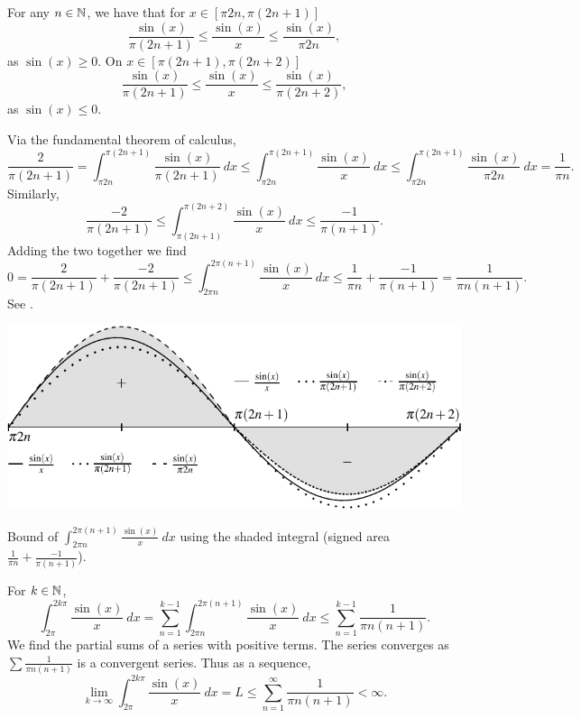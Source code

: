 \begin{example}
For any $n \in {\mathbb{N}}$, we have that for $x \in [\pi 2n, \pi (2n+1)]$
\begin{equation*}
\frac{\sin(x)}{\pi (2n+1)}
\leq
\frac{\sin(x)}{x}
\leq
\frac{\sin(x)}{\pi 2n} ,
\end{equation*}
as $\sin(x) \geq 0$.  On $x \in [\pi (2n+1), \pi (2n+2)]$
\begin{equation*}
\frac{\sin(x)}{\pi (2n+1)}
\leq
\frac{\sin(x)}{x}
\leq
\frac{\sin(x)}{\pi (2n+2)} ,
\end{equation*}
as $\sin(x) \leq 0$.

Via the fundamental theorem of calculus,
\begin{equation*}
\frac{2}{\pi (2n+1)}
=
\int_{\pi 2n}^{\pi (2n+1)}
\frac{\sin(x)}{\pi (2n+1)}
~dx
\leq
\int_{\pi 2n}^{\pi (2n+1)}
\frac{\sin(x)}{x}
~dx
\leq
\int_{\pi 2n}^{\pi (2n+1)}
\frac{\sin(x)}{\pi 2n}
~dx
=
\frac{1}{\pi n} .
\end{equation*}
Similarly,
\begin{equation*}
\frac{-2}{\pi (2n+1)}
\leq
\int_{\pi (2n+1)}^{\pi (2n+2)}
\frac{\sin(x)}{x}
~dx
\leq
\frac{-1}{\pi (n+1)} .
\end{equation*}
Adding the two together we find
\begin{equation*}
0
=
\frac{2}{\pi (2n+1)}
+
\frac{-2}{\pi (2n+1)}
\leq
\int_{2\pi n}^{2\pi (n+1)}
\frac{\sin(x)}{x}
~dx
\leq
\frac{1}{\pi n} 
+
\frac{-1}{\pi (n+1)} 
=
\frac{1}{\pi n(n+1)} .
\end{equation*}
See .
\begin{myfigureht}
\includegraphics{figures/sincbound}
\caption{Bound of $\int_{2\pi n}^{2\pi (n+1)} \frac{\sin(x)}{x} ~dx$ using
the shaded integral (signed area
$\frac{1}{\pi n} 
+
\frac{-1}{\pi (n+1)}$).\label{fig:sincbound}}
\end{myfigureht}

For $k \in {\mathbb{N}}$, 
\begin{equation*}
\int_{2\pi}^{2k\pi} \frac{\sin(x)}{x} ~dx
=
\sum_{n=1}^{k-1}
\int_{2\pi n}^{2\pi (n+1)} \frac{\sin(x)}{x} ~dx 
\leq
\sum_{n=1}^{k-1}
\frac{1}{\pi n(n+1)} .
\end{equation*}
We find the partial sums of a series with positive terms.
The series
converges as
$\sum \frac{1}{\pi n (n+1)}$ is a convergent series.  Thus
as a sequence,
\begin{equation*}
\lim_{k\to \infty} \int_{2\pi}^{2k\pi} \frac{\sin(x)}{x} ~dx
=L \leq
\sum_{n=1}^{\infty}
\frac{1}{\pi n(n+1)} < \infty .
\end{equation*}


\end{example}
